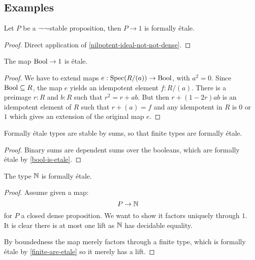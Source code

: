 \subsection{Examples}

\begin{proposition}%
  Let $P$ be a $\neg\neg$-stable proposition,
  then $P\to 1$ is formally étale.
\end{proposition}

\begin{proof}
  Direct application of \cref{nilpotent-ideal-not-not-dense}.
\end{proof}

\begin{proposition}\label{bool-is-etale}
  The map $\mathrm{Bool}\to 1$ is étale.
\end{proposition}

\begin{proof}
  We have to extend maps $e:\operatorname{Spec} (R/(a))\to \mathrm{Bool}$, with $a^2=0$.
  Since $\mathrm{Bool}\subseteq R$, the map $e$ yields an idempotent element $f:R/(a)$.
  There is a preimage $r:R$ and $b:R$ such that $r^2=r+ab$.
  But then $r+(1-2r)ab$ is an idempotent element of $R$ such that $r+(a)=f$
  and any idempotent in $R$ is $0$ or $1$ which gives an extension of the original map $e$.
\end{proof}

\begin{proposition}\label{finite-are-etale}
Formally étale types are stable by sums, so that finite types are formally étale.
\end{proposition}

\begin{proof}
Binary sums are dependent sums over the booleans, which are formally étale by \cref{bool-is-etale}.
\end{proof}

\begin{proposition}
The type $\mathbb{N}$ is formally étale.
\end{proposition}

\begin{proof}
Assume given a map:
\[P\to \mathbb{N}\]
for $P$ a closed dense proposition. We want to show it factors uniquely through $1$. It is clear there is at most one lift as $\mathbb{N}$ has decidable equality.

By boundedness the map merely factors through a finite type, which is formally étale by \cref{finite-are-etale} so it merely has a lift.
\end{proof}


